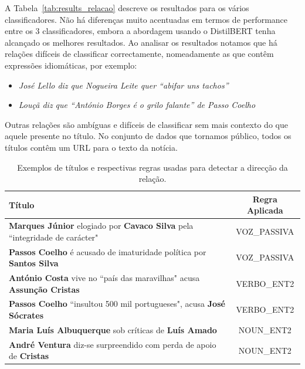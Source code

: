 \documentclass[a4paper, twocolumn, 11pt, twoside]{article}
\begin{document}
A Tabela~\ref{tab:results_relacao} descreve os resultados para os vários classificadores. Não há diferenças muito acentuadas em termos de performance entre os 3 classificadores, embora a abordagem usando o DistilBERT tenha alcançado os melhores resultados. Ao analisar os resultados notamos que há relações difíceis de classificar correctamente, nomeadamente as que contêm expressões idiomáticas, por exemplo:

\begin{itemize}
\item{\textit{José Lello diz que Nogueira Leite quer “abifar uns tachos”}}
\item{\textit{Louçã diz que “António Borges é o grilo falante” de Passo Coelho}}
\end{itemize}

Outras relações são ambíguas e difíceis de classificar sem mais contexto do que aquele presente no título. No conjunto de dados que tornamos público, todos os títulos contêm um URL para o texto da notícia.

\begin{table}
  \centering
  \begin{tabular}{lc}
      {\bf Título} & {\bf Regra Aplicada} \\
      \hline
	  \textbf{Marques Júnior} elogiado por \textbf{Cavaco Silva} pela ``integridade de carácter" & VOZ\_PASSIVA \\
	  \textbf{Passos Coelho} é acusado de imaturidade política por \textbf{Santos Silva}  		 & VOZ\_PASSIVA \\
	  \textbf{António Costa} vive no ``país das maravilhas" acusa \textbf{Assunção Cristas}      & VERBO\_ENT2 \\
	  \textbf{Passos Coelho} ``insultou 500 mil portugueses", acusa \textbf{José Sócrates}		 & VERBO\_ENT2 \\ 
	  \textbf{Maria Luís Albuquerque} sob críticas de \textbf{Luís Amado}						 & NOUN\_ENT2 \\
	  \textbf{André Ventura} diz-se surpreendido com perda de apoio de \textbf{Cristas}			 & NOUN\_ENT2 \\

	  \hline
  \end{tabular}
  \caption{Exemplos de títulos e respectivas regras usadas para detectar a direcção da relação.}
  \label{tab:examples_patterns_direction}
\end{table}
\end{document}
